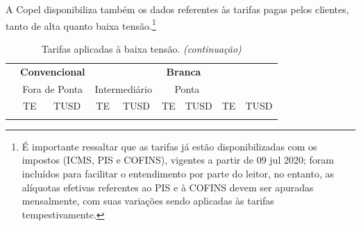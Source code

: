 \documentclass[grad,numbers]{coppe}
\begin{document}
  A Copel disponibiliza também os dados referentes às tarifas pagas pelos clientes, tanto de alta quanto baixa tensão.\footnote{É importante ressaltar que as tarifas já estão disponibilizadas com os impostos (ICMS, PIS e COFINS), vigentes a partir de 09 jul 2020; foram incluídos para facilitar o entendimento por parte do leitor, no entanto, as alíquotas efetivas referentes ao PIS e à COFINS devem ser apuradas mensalmente, com suas variações sendo aplicadas às tarifas tempestivamente.}

  \begingroup\fontsize{10}{12}\selectfont
  \begin{longtable}[t]{>{\centering\arraybackslash}p{8em}cccccccc}
  \caption{\label{tab:unnamed-chunk-16}Tarifas aplicadas à baixa tensão.}\\
  \toprule
  \multicolumn{1}{c}{\textbf{ }} & \multicolumn{2}{c}{\textbf{Convencional}} & \multicolumn{6}{c}{\textbf{Branca}} \\
  \cmidrule(l{3pt}r{3pt}){2-3} \cmidrule(l{3pt}r{3pt}){4-9}
  \multicolumn{3}{c}{ } & \multicolumn{2}{c}{Fora de Ponta} & \multicolumn{2}{c}{Intermediário} & \multicolumn{2}{c}{Ponta} \\
  \cmidrule(l{3pt}r{3pt}){4-5} \cmidrule(l{3pt}r{3pt}){6-7} \cmidrule(l{3pt}r{3pt}){8-9}
  \multicolumn{1}{c}{ } & \multicolumn{1}{c}{TE} & \multicolumn{1}{c}{TUSD} & \multicolumn{1}{c}{TE} & \multicolumn{1}{c}{TUSD} & \multicolumn{1}{c}{TE} & \multicolumn{1}{c}{TUSD} & \multicolumn{1}{c}{TE} & \multicolumn{1}{c}{TUSD} \\
  \cmidrule(l{3pt}r{3pt}){2-2} \cmidrule(l{3pt}r{3pt}){3-3} \cmidrule(l{3pt}r{3pt}){4-4} \cmidrule(l{3pt}r{3pt}){5-5} \cmidrule(l{3pt}r{3pt}){6-6} \cmidrule(l{3pt}r{3pt}){7-7} \cmidrule(l{3pt}r{3pt}){8-8} \cmidrule(l{3pt}r{3pt}){9-9}
  \endfirsthead
  \caption[]{\label{tab:unnamed-chunk-16}Tarifas aplicadas à baixa tensão. \textit{(continuação)}}\\
  \toprule
  \endhead


\end{longtable}
\end{document}
